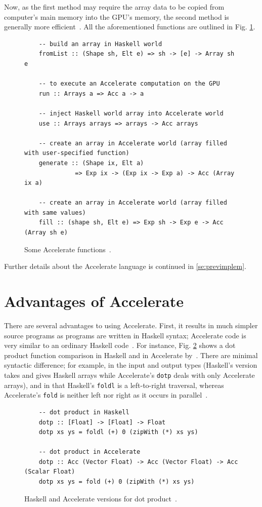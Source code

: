 Now, as the first method may require the array data to be copied from computer's main memory into the GPU's memory, the second method is generally more efficient~\cite{Mar13}. All the aforementioned functions are outlined in Fig. \ref{fig:acc-functions}.

\begin{figure}
  \begin{lstlisting}
    -- build an array in Haskell world
    fromList :: (Shape sh, Elt e) => sh -> [e] -> Array sh e

	-- to execute an Accelerate computation on the GPU
    run :: Arrays a => Acc a -> a
    
    -- inject Haskell world array into Accelerate world
    use :: Arrays arrays => arrays -> Acc arrays
    
    -- create an array in Accelerate world (array filled with user-specified function)
    generate :: (Shape ix, Elt a) 
              => Exp ix -> (Exp ix -> Exp a) -> Acc (Array ix a)
    
    -- create an array in Accelerate world (array filled with same values)
    fill :: (shape sh, Elt e) => Exp sh -> Exp e -> Acc (Array sh e)
  \end{lstlisting}
  \caption{Some Accelerate functions~\cite{Mar13}.}
  \label{fig:acc-functions}
\end{figure}

Further details about the Accelerate language is continued in \ref{se:previmplem}.

\section{Advantages of Accelerate}\label{se:acc-adv}

There are several advantages to using Accelerate. First, it results in much simpler source programs as programs are written in Haskell syntax; Accelerate code is very similar to an ordinary Haskell code~\cite{Mar13}. For instance, Fig. \ref{fig:dotp} shows a dot product function comparison in Haskell and in Accelerate by~\cite{McD13}. There are minimal syntactic difference; for example, in the input and output types (Haskell's version takes and gives Haskell arrays while Accelerate's \texttt{dotp} deals with only Accelerate arrays), and in that Haskell's \texttt{foldl} is a left-to-right traversal, whereas Accelerate's \texttt{fold} is neither left nor right as it occurs in parallel~\cite{McD13}.

\begin{figure}
  \begin{lstlisting}
    -- dot product in Haskell
    dotp :: [Float] -> [Float] -> Float
    dotp xs ys = foldl (+) 0 (zipWith (*) xs ys)
           
    -- dot product in Accelerate
    dotp :: Acc (Vector Float) -> Acc (Vector Float) -> Acc (Scalar Float)
    dotp xs ys = fold (+) 0 (zipWith (*) xs ys)
  \end{lstlisting}
  \caption{Haskell and Accelerate versions for dot product~\cite{McD13}.}
  \label{fig:dotp}
\end{figure}

